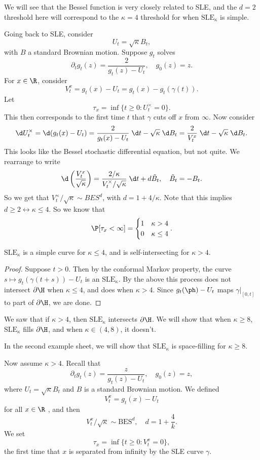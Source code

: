 \documentclass[a4paper]{article}
\newcommand\SLE{\mathrm{SLE}}
\begin{document}
We will see that the Bessel function is very closely related to SLE, and the $d = 2$ threshold here will correspond to the $\kappa = 4$ threshold for when $\SLE_\kappa$ is simple.

Going back to SLE, consider
\[
  U_t = \sqrt{\kappa} B_t,
\]
with $B$ a standard Brownian motion. Suppose $g_t$ solves
\[
  \partial_t g_t(z) = \frac{2}{g_t(z) - U_t},\quad g_0(z) = z.
\]
For $x \in \R$, consider
\[
  V_t^x = g_t(x) - U_t = g_t(x) - g_t(\gamma(t)).
\]
Let
\[
  \tau_x = \inf \{t \geq 0: U_t^\times = 0\}.
\]
This then corresponds to the first time $t$ that $\gamma$ cuts off $x$ from $\infty$. Now consider
\[
  \d U_t^\times = \d (g_t(x) - U_t) = \frac{2}{g_t(x) - U_t}\;\d t - \sqrt{\kappa}\;\d B_t = \frac{2}{V_t^x}\;\d t - \sqrt{\kappa} \;\d B_t.
\]
This looks like the Bessel stochastic differential equation, but not quite. We rearrange to write
\[
  \d \left(\frac{V_t^x}{\sqrt{\kappa}}\right) = \frac{2/\kappa}{V_t^\times/\sqrt{\kappa}} \;\d t + d \tilde{B}_t,\quad \tilde{B}_t = - B_t.
\]
So we get that $V_t^\times/\sqrt{\kappa} \sim BES^d$, with $d = 1 + 4/\kappa$. Note that this implies $d \geq 2 \leftrightarrow \kappa \leq 4$. So we know that
\[
  \P[\tau_x < \infty] =
  \begin{cases}
    1 & \kappa > 4\\
    0 & \kappa \leq 4
  \end{cases}.
\]
\begin{prop}
  $\SLE_\kappa$ is a simple curve for $\kappa \leq 4$, and is self-intersecting for $\kappa > 4$.
\end{prop}

\begin{proof}
  Suppose $t > 0$. Then by the conformal Markov property, the curve $s \mapsto g_t(\gamma(t + s)) - U_t$ is an $\SLE_\kappa$. By the above this process does not intersect $\partial \H$ when $\kappa \leq 4$, and does when $\kappa > 4$. Since $g_t(\ph) - U_t$ maps $\gamma|_{[0, t]}$ to part of $\partial \H$, we are done.
\end{proof}

We saw that if $\kappa > 4$, then $\SLE_\kappa$ intersects $\partial \H$. We will show that when $\kappa \geq 8$, $\SLE_\kappa$ fills $\partial \H$, and when $\kappa \in (4, 8)$, it doesn't.

In the second example sheet, we will show that $\SLE_\kappa$ is space-filling for $\kappa \geq 8$.

Now assume $\kappa > 4$. Recall that
\[
  \partial_t g_t(z) = \frac{z}{g_t(z) - U_t},\quad g_0(z) = z,
\]
where $U_t = \sqrt{\kappa} B_t$ and $B$ is a standard Brownian motion. We defined
\[
  V_t^x = g_t(x) - U_t
\]
for all $x \in \R$ , and then
\[
  V_t^x /\sqrt{\kappa} \sim \mathrm{BES}^d,\quad d = 1 + \frac{4}{k}.
\]
We set
\[
  \tau_x = \inf \{t \geq 0: V_t^x = 0\},
\]
the first time that $x$ is separated from infinity by the SLE curve $\gamma$.
\end{document}
